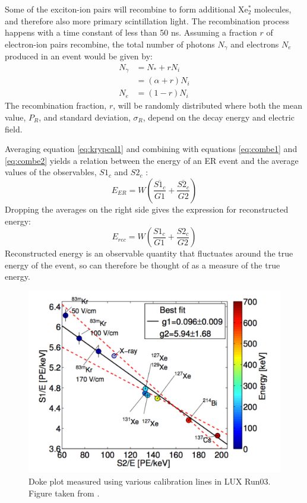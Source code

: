 Some of the exciton-ion pairs will recombine to form additional Xe$_2^*$ molecules, and therefore also more primary scintillation light. The recombination process happens with a time constant of less than 50 ns\cite{rectime}. Assuming a fraction $r$ of electron-ion pairs recombine, the total number of photons $N_{\gamma}$ and electrons $N_{e}$ produced in an event would be given by:
\begin{equation}\label{eq:combe2}
\begin{split}
N_{\gamma}&=N_*+rN_i\\
&=(\alpha+r)N_i\\
N_e&=(1-r)N_i
\end{split}
\end{equation}
The recombination fraction, $r$, will be randomly distributed where both the mean value, $P_R$, and standard deviation, $\sigma_R$, depend on the decay energy and electric field.

Averaging equation \ref{eq:krypcal1} and combining with equations \ref{eq:combe1} and \ref{eq:combe2} yields a relation between the energy of an ER event and the average values of the observables, $S1_c$ and $S2_c$ :
\begin{equation}\label{eq:combe3}
E_{ER}=W(\frac{\overline{S1_c}}{G1}+\frac{\overline{S2_c}}{G2})
\end{equation}
Dropping the averages on the right side gives the expression for reconstructed energy: 
\begin{equation}\label{eq:combe3}
E_{rec}=W(\frac{S1_c}{G1}+\frac{S2_c}{G2})
\end{equation}
Reconstructed energy is an observable quantity that fluctuates around the true energy of the event, so can therefore be thought of as a measure of the true energy.
\begin{figure}[!h]
\includegraphics[width=\linewidth]{Figures/Doke_plot_run03.pdf}
\caption{Doke plot measured using various calibration lines in LUX Run03. Figure taken from \cite{attila}.}
\label{fig:lux_doke_plot} 
\end{figure}

